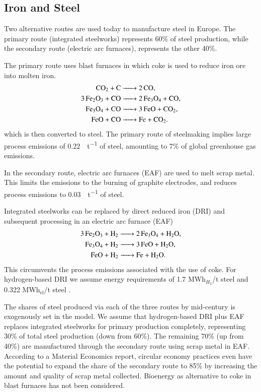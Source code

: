 \subsection{Iron and Steel}
\label{sec:si:industry:steel}

Two alternative routes are used today to manufacture steel in Europe. The
primary route (integrated steelworks) represents 60\% of steel production, while
the secondary route (electric arc furnaces), represents the other 40\%.

The primary route uses blast furnaces in which coke is used to reduce iron ore
into molten iron.
\begin{align}
    \ce{CO2 + C &-> 2CO}, \\
    \ce{3Fe2O3 + CO &-> 2Fe3O4 + CO}, \\
    \ce{Fe3O4 + CO &-> 3FeO + CO2}, \\
    \ce{FeO + CO &-> Fe + CO2}.
\end{align}
which is then converted to steel. The primary route of steelmaking implies large
process emissions of \SI{0.22}{\tco\per\tonne} of steel, amounting to 7\% of
global greenhouse gas emissions.

In the secondary route, electric arc furnaces (EAF) are used to melt scrap
metal. This limits the \co emissions to the burning of graphite electrodes,
 and reduces process emissions to
\SI{0.03}{\tco\per\tonne} of steel.

Integrated steelworks can be replaced by direct reduced iron (DRI) and subsequent processing in an electric arc furnace (EAF)
\begin{align}
    \ce{3Fe2O3 + H2 &-> 2Fe3O4 + H2O}, \\
    \ce{Fe3O4 + H2 &-> 3FeO + H2O}, \\
    \ce{FeO + H2 &-> Fe + H2O}.
\end{align}
This circumvents the process emissions associated with the use of coke. For
hydrogen-based DRI we assume energy requirements of 1.7 MWh$_{H_2}$/t steel
 and 0.322 MWh$_{\text{el}}$/t steel
.

The shares of steel produced via each of the three routes by mid-century is exogenously
set in the model. We assume that hydrogen-based DRI plus EAF replaces integrated
steelworks for primary production completely, representing 30\% of total steel
production (down from 60\%). The remaining 70\% (up from 40\%) are manufactured
through the secondary route using scrap metal in EAF. According to
a Material Economics report, circular economy practices even have the potential to
expand the share of the secondary route to 85\% by increasing the amount and
quality of scrap metal collected. Bioenergy as alternative to coke in blast
furnaces has not been considered.

